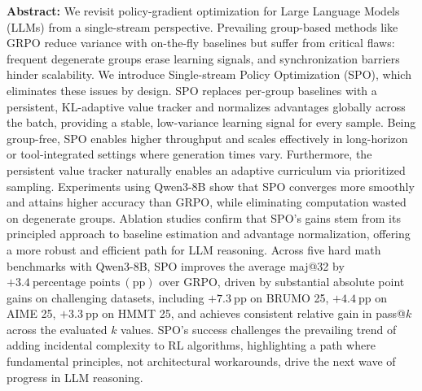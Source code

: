 \textbf{Abstract:} 
We revisit policy-gradient optimization for Large Language Models (LLMs) from a single-stream perspective. Prevailing group-based methods like GRPO reduce variance with on-the-fly baselines but suffer from critical flaws: frequent degenerate groups erase learning signals, and synchronization barriers hinder scalability. We introduce Single-stream Policy Optimization (SPO), which eliminates these issues by design. SPO replaces per-group baselines with a persistent, KL-adaptive value tracker and normalizes advantages globally across the batch, providing a stable, low-variance learning signal for every sample. Being group-free, SPO enables higher throughput and scales effectively in long-horizon or tool-integrated settings where generation times vary. Furthermore, the persistent value tracker naturally enables an adaptive curriculum via prioritized sampling. Experiments using Qwen3-8B show that SPO converges more smoothly and attains higher accuracy than GRPO, while eliminating computation wasted on degenerate groups. Ablation studies confirm that SPO's gains stem from its principled approach to baseline estimation and advantage normalization, offering a more robust and efficient path for LLM reasoning. Across five hard math benchmarks with Qwen3-8B, SPO improves the average maj@32 by $+3.4~\text{percentage points}~(\mathrm{pp})$ over GRPO, driven by substantial absolute point gains on challenging datasets, including $+7.3~\mathrm{pp}$ on BRUMO 25, $+4.4~\mathrm{pp}$ on AIME 25, $+3.3~\mathrm{pp}$ on HMMT 25, and achieves consistent relative gain in pass@$k$ across the evaluated $k$ values. SPO's success challenges the prevailing trend of adding incidental complexity to RL algorithms, highlighting a path where fundamental principles, not architectural workarounds, drive the next wave of progress in LLM reasoning.
